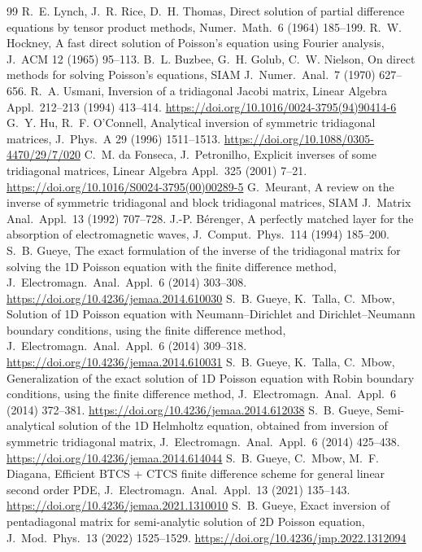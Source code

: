 \documentclass[preprint,12pt,a4paper]{elsarticle}
\begin{document}
\begin{thebibliography}{99}
 R.~E. Lynch, J.~R. Rice, D.~H. Thomas, Direct solution of partial difference equations by tensor product methods, Numer.\ Math.\ 6 (1964) 185--199.
 R.~W. Hockney, A fast direct solution of Poisson's equation using Fourier analysis, J.\ ACM 12 (1965) 95--113.
 B.~L. Buzbee, G.~H. Golub, C.~W. Nielson, On direct methods for solving Poisson's equations, SIAM J.\ Numer.\ Anal.\ 7 (1970) 627--656.
 R.~A. Usmani, Inversion of a tridiagonal Jacobi matrix, Linear Algebra Appl.\ 212--213 (1994) 413--414. \url{https://doi.org/10.1016/0024-3795(94)90414-6}
 G.~Y. Hu, R.~F. O'Connell, Analytical inversion of symmetric tridiagonal matrices, J.\ Phys.\ A 29 (1996) 1511--1513. \url{https://doi.org/10.1088/0305-4470/29/7/020}
 C.~M. da Fonseca, J.~Petronilho, Explicit inverses of some tridiagonal matrices, Linear Algebra Appl.\ 325 (2001) 7--21. \url{https://doi.org/10.1016/S0024-3795(00)00289-5}
 G.~Meurant, A review on the inverse of symmetric tridiagonal and block tridiagonal matrices, SIAM J.\ Matrix Anal.\ Appl.\ 13 (1992) 707--728.
 J.-P. B\'erenger, A perfectly matched layer for the absorption of electromagnetic waves, J.\ Comput.\ Phys.\ 114 (1994) 185--200.
 S.~B. Gueye, The exact formulation of the inverse of the tridiagonal matrix for solving the 1D Poisson equation with the finite difference method, J.\ Electromagn.\ Anal.\ Appl.\ 6 (2014) 303--308. \url{https://doi.org/10.4236/jemaa.2014.610030}
 S.~B. Gueye, K.~Talla, C.~Mbow, Solution of 1D Poisson equation with Neumann--Dirichlet and Dirichlet--Neumann boundary conditions, using the finite difference method, J.\ Electromagn.\ Anal.\ Appl.\ 6 (2014) 309--318. \url{https://doi.org/10.4236/jemaa.2014.610031}
 S.~B. Gueye, K.~Talla, C.~Mbow, Generalization of the exact solution of 1D Poisson equation with Robin boundary conditions, using the finite difference method, J.\ Electromagn.\ Anal.\ Appl.\ 6 (2014) 372--381. \url{https://doi.org/10.4236/jemaa.2014.612038}
 S.~B. Gueye, Semi-analytical solution of the 1D Helmholtz equation, obtained from inversion of symmetric tridiagonal matrix, J.\ Electromagn.\ Anal.\ Appl.\ 6 (2014) 425--438. \url{https://doi.org/10.4236/jemaa.2014.614044}
 S.~B. Gueye, C.~Mbow, M.~F. Diagana, Efficient BTCS + CTCS finite difference scheme for general linear second order PDE, J.\ Electromagn.\ Anal.\ Appl.\ 13 (2021) 135--143. \url{https://doi.org/10.4236/jemaa.2021.1310010}
 S.~B. Gueye, Exact inversion of pentadiagonal matrix for semi-analytic solution of 2D Poisson equation, J.\ Mod.\ Phys.\ 13 (2022) 1525--1529. \url{https://doi.org/10.4236/jmp.2022.1312094}
\end{thebibliography}
\end{document}
